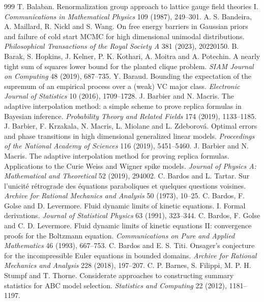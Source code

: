 \begin{thebibliography}{999}
 T. Balaban. Renormalization group approach to lattice gauge field theories I. \emph{Communications in Mathematical Physics} 109 (1987), 249--301.
 A. S. Bandeira, A. Maillard, R. Nickl and S. Wang. On free energy barriers in Gaussian priors and failure of cold start MCMC for high dimensional unimodal distributions. \emph{Philosophical Transactions of the Royal Society A} 381 (2023), 20220150.
 B. Barak, S. Hopkins, J. Kelner, P. K. Kothari, A. Moitra and A. Potechin. A nearly tight sum of squares lower bound for the planted clique problem. \emph{SIAM Journal on Computing} 48 (2019), 687--735.
 Y. Baraud. Bounding the expectation of the supremum of an empirical process over a (weak) VC major class. \emph{Electronic Journal of Statistics} 10 (2016), 1709--1728.
 J. Barbier and N. Macris. The adaptive interpolation method: a simple scheme to prove replica formulas in Bayesian inference. \emph{Probability Theory and Related Fields} 174 (2019), 1133--1185.
 J. Barbier, F. Krzakala, N. Macris, L. Miolane and L. Zdeborov\'a. Optimal errors and phase transitions in high dimensional generalized linear models. \emph{Proceedings of the National Academy of Sciences} 116 (2019), 5451--5460.
 J. Barbier and N. Macris. The adaptive interpolation method for proving replica formulas. Applications to the Curie Weiss and Wigner spike models. \emph{Journal of Physics A: Mathematical and Theoretical} 52 (2019), 294002.
 C. Bardos and L. Tartar. Sur l'unicit\'e r\'etrograde des \'equations paraboliques et quelques questions voisines. \emph{Archive for Rational Mechanics and Analysis} 50 (1973), 10--25.
 C. Bardos, F. Golse and D. Levermore. Fluid dynamic limits of kinetic equations. I. Formal derivations. \emph{Journal of Statistical Physics} 63 (1991), 323--344.
 C. Bardos, F. Golse and C. D. Levermore. Fluid dynamic limits of kinetic equations II: convergence proofs for the Boltzmann equation. \emph{Communications on Pure and Applied Mathematics} 46 (1993), 667--753.
 C. Bardos and E. S. Titi. Onsager's conjecture for the incompressible Euler equations in bounded domains. \emph{Archive for Rational Mechanics and Analysis} 228 (2018), 197--207.
 C. P. Barnes, S. Filippi, M. P. H. Stumpf and T. Thorne. Considerate approaches to constructing summary statistics for ABC model selection. \emph{Statistics and Computing} 22 (2012), 1181--1197.

\end{thebibliography}
